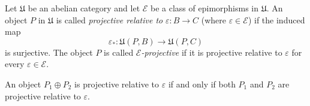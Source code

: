 Let $\mathfrak{U}$ be an abelian category and let $\mathcal{E}$ be a class of epimorphisms in $\mathfrak{U}$. An object $P$ in $\mathfrak{U}$ is called {\it projective relative to} $\varepsilon : B \to C$ (where $\varepsilon \in \mathcal{E}$) if the induced map
\[
\varepsilon_* : \mathfrak{U}(P, B) \to \mathfrak{U}(P, C)
\]
is surjective. The object $P$ is called {\it $\mathcal{E}$-projective} if it is projective relative to $\varepsilon$ for every $\varepsilon \in \mathcal{E}$.

An object $P_1 \oplus P_2$ is projective relative to $\varepsilon$ if and only if both $P_1$ and $P_2$ are projective relative to $\varepsilon$.

